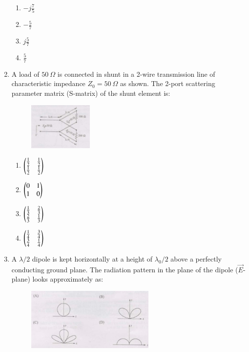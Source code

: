 \documentclass[journal,12pt,onecolumn]{IEEEtran}
\theoremstyle{remark}
\begin{document}
\begin{enumerate}
\begin{multicols}{4}
\begin{enumerate}
  \item $-j\frac{7}{5}$
  \item $-\frac{5}{7}$
  \item $j\frac{5}{7}$
  \item $\frac{5}{7}$
\end{enumerate}
\end{multicols}

\item A load of $50~\Omega$ is connected in shunt in a 2-wire transmission line of characteristic impedance $Z_0=50~\Omega$ as shown. The 2-port scattering parameter matrix (S-matrix) of the shunt element is: 

\begin{figure}[ht!]
    \centering
    \includegraphics[width=0.3\textwidth]{Q68.jpg}
    \caption{}
    \label{fig:Q67.jpg}
\end{figure}
\hfill{}

\begin{multicols}{4}
\begin{enumerate}
    \item $\begin{pmatrix}\tfrac{1}{2} & \tfrac{1}{2} \\ \tfrac{1}{2} & \tfrac{1}{2}\end{pmatrix}$
    \item $\begin{pmatrix}0 & 1 \\ 1 & 0\end{pmatrix}$
    \item $\begin{pmatrix}\tfrac{1}{3} & \tfrac{2}{3} \\ \tfrac{2}{3} & \tfrac{1}{3}\end{pmatrix}$
    \item $\begin{pmatrix}\tfrac{1}{4} & \tfrac{3}{4} \\ \tfrac{3}{4} & \tfrac{1}{4}\end{pmatrix}$
\end{enumerate}
\end{multicols}

\item A $\lambda/2$ dipole is kept horizontally at a height of $\lambda_0/2$ above a perfectly conducting ground plane. The radiation pattern in the plane of the dipole ($\vec{E}$-plane) looks approximately as: 

\begin{figure}[ht!]
    \centering
    \includegraphics[width=0.6\textwidth]{Q69.jpg}
    \caption{}
    \label{fig:Q69.jpg}
\end{figure}
\hfill{}


\end{enumerate}
\end{document}
